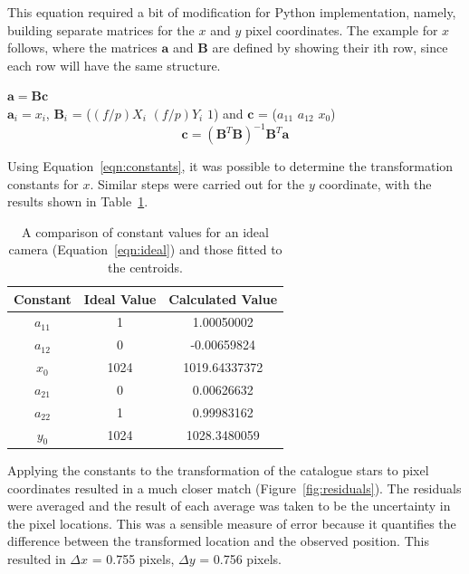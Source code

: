 \documentclass[a4paper,12pt]{article}
\begin{document}
This equation required a bit of modification for Python implementation, namely, building separate matrices for the $x$ and $y$ pixel coordinates. The example for $x$ follows, where the matrices $\mathbf{a}$ and $\mathbf{B}$ are defined by showing their ith row, since each row will have the same structure.

\begin{center}

$\mathbf{a} = \mathbf{B}\mathbf{c}$\\

$\mathbf{a}_{i} = x_{i}$, $\mathbf{B}_{i}$ = ($(f/p)X_{i}$  $(f/p)Y_{i}$   $1$) and $\mathbf{c}$ = ($a_{11}$  $a_{12}$  $x_{0}$)\\

\begin{equation}
\mathbf{c} = (\mathbf{B}^{T}\mathbf{B})^{-1}\mathbf{B}^{T}\mathbf{a}
\label{eqn:constants}
\end{equation}

\end{center}

Using Equation~\ref{eqn:constants}, it was possible to determine the transformation constants for $x$. Similar steps were carried out for the $y$ coordinate, with the results shown in Table~\ref{tab:constants}.

\begin{center}
\begin{table}[!htbp]
  \centering
  \begin{tabular}{c||c||c}
  	Constant & Ideal Value & Calculated Value \\
  	\hline
  	$a_{11}$ & 1 & 1.00050002 \\
  	$a_{12}$ & 0 & -0.00659824 \\
  	$x_{0}$ & 1024 & 1019.64337372 \\
  	$a_{21}$ & 0 & 0.00626632 \\
  	$a_{22}$ & 1 & 0.99983162 \\
  	$y_{0}$ & 1024 & 1028.3480059 \\
   \end{tabular}
    \caption{A comparison of constant values for an ideal camera (Equation~\ref{eqn:ideal}) and those fitted to the centroids.}
    \label{tab:constants}
\end{table}
\end{center}

Applying the constants to the transformation of the catalogue stars to pixel coordinates resulted in a much closer match (Figure~\ref{fig:residuals}). The residuals were averaged and the result of each average was taken to be the uncertainty in the pixel locations. This was a sensible measure of error because it quantifies the difference between the transformed location and the observed position. This resulted in $\Delta x$ = 0.755 pixels, $\Delta y$ = 0.756 pixels.
\end{document}
